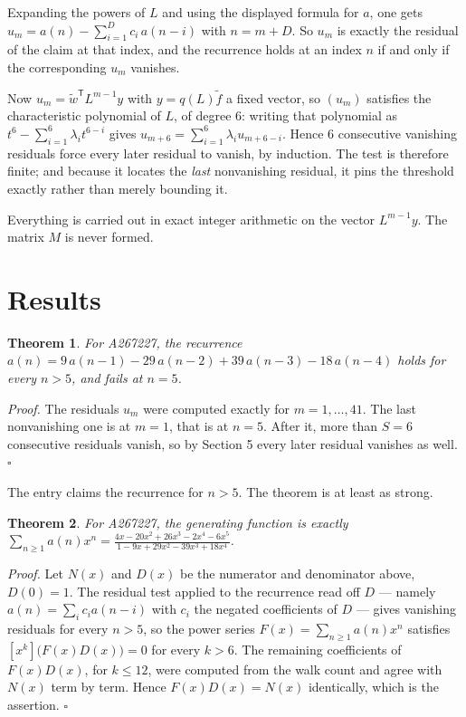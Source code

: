 \documentclass[11pt]{article}
\newtheorem{theorem}{Theorem}
\theoremstyle{definition}
\begin{document}
Expanding the powers of $L$ and using the displayed formula for $a$, one gets $u_m = a(n) - \sum_{i=1}^{D} c_i\,a(n-i)$ with $n = m + D$. So $u_m$ is exactly the residual of the claim at that index, and the recurrence holds at an index $n$ if and only if the corresponding $u_m$ vanishes.

Now $u_m = \tilde w^{\mathsf T} L^{m-1} y$ with $y = q(L)\tilde f$ a fixed vector, so $(u_m)$ satisfies the characteristic polynomial of $L$, of degree $6$: writing that polynomial as $t^{6} - \sum_{i=1}^{6} \lambda_i t^{6-i}$ gives $u_{m+6} = \sum_{i=1}^{6} \lambda_i u_{m+6-i}$. Hence $6$ consecutive vanishing residuals force every later residual to vanish, by induction. The test is therefore finite; and because it locates the {\itshape last} nonvanishing residual, it pins the threshold exactly rather than merely bounding it.

Everything is carried out in exact integer arithmetic on the vector $L^{m-1}y$. The matrix $M$ is never formed.

\section{Results}

\begin{theorem} For A267227, the recurrence $a(n) = 9\,a(n-1) - 29\,a(n-2) + 39\,a(n-3) - 18\,a(n-4)$ holds for every $n > 5$, and fails at $n = 5$.\end{theorem}

{\itshape Proof.} The residuals $u_m$ were computed exactly for $m = 1,\dots,41$. The last nonvanishing one is at $m = 1$, that is at $n = 5$. After it, more than $S = 6$ consecutive residuals vanish, so by Section 5 every later residual vanishes as well. $\square$

The entry claims the recurrence for $n > 5$. The theorem is at least as strong.

\begin{theorem} For A267227, the generating function is exactly $\sum_{n\ge 1} a(n)x^n = \frac{4x - 20x^{2} + 26x^{3} - 2x^{4} - 6x^{5}}{1 - 9x + 29x^{2} - 39x^{3} + 18x^{4}}$.\end{theorem}

{\itshape Proof.} Let $N(x)$ and $D(x)$ be the numerator and denominator above, $D(0)=1$. The residual test applied to the recurrence read off $D$ --- namely $a(n) = \sum_i c_i a(n-i)$ with $c_i$ the negated coefficients of $D$ --- gives vanishing residuals for every $n > 5$, so the power series $F(x)=\sum_{n\ge 1}a(n)x^n$ satisfies $[x^k]\bigl(F(x)D(x)\bigr) = 0$ for every $k > 6$. The remaining coefficients of $F(x)D(x)$, for $k \le 12$, were computed from the walk count and agree with $N(x)$ term by term. Hence $F(x)D(x) = N(x)$ identically, which is the assertion. $\square$
\end{document}
